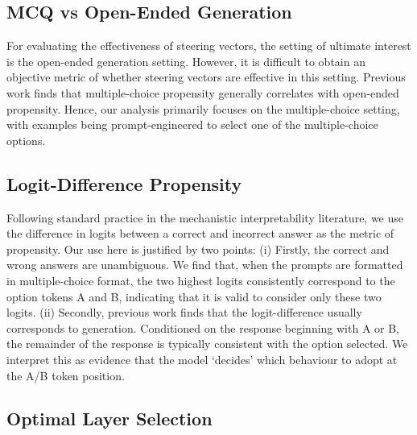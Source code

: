 \documentclass{article}
\begin{document}
\subsection{MCQ vs Open-Ended Generation} For evaluating the effectiveness of steering vectors, the setting of ultimate interest is the open-ended generation setting. However, it is difficult to obtain an objective metric of whether steering vectors are effective in this setting. Previous work \citep{rimskySteeringLlamaContrastive2023, zouRepresentationEngineeringTopDown2023} finds that multiple-choice propensity generally correlates with open-ended propensity. Hence, our analysis primarily focuses on the multiple-choice setting, with examples being prompt-engineered to select one of the multiple-choice options.

\subsection{Logit-Difference Propensity}\label{sec:logit_diff}
Following standard practice in the mechanistic interpretability literature, we use the difference in logits between a correct and incorrect answer as the metric of propensity. Our use here is justified by two points: (i) Firstly, the correct and wrong answers are unambiguous. We find that, when the prompts are formatted in multiple-choice format, the two highest logits consistently correspond to the option tokens A and B, indicating that it is valid to consider only these two logits. 
(ii) Secondly, previous work \citep{rimskySteeringLlamaContrastive2023} finds that the logit-difference usually corresponds to generation. Conditioned on the response beginning with A or B, the remainder of the response is typically consistent with the option selected. We interpret this as evidence that the model `decides' which behaviour to adopt at the A/B token position. 



\subsection{Optimal Layer Selection}
\label{sec:layer_selection}
\end{document}
